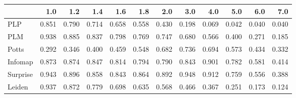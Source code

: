 \begin{tabular}{lrrrrrrrrrrr}
\toprule
{} &   1.0 &   1.2 &   1.4 &   1.6 &   1.8 &   2.0 &   3.0 &   4.0 &   5.0 &   6.0 &   7.0 \\
\midrule
PLP      & 0.851 & 0.790 & 0.714 & 0.658 & 0.558 & 0.430 & 0.198 & 0.069 & 0.042 & 0.040 & 0.040 \\
PLM      & 0.938 & 0.885 & 0.837 & 0.798 & 0.769 & 0.747 & 0.680 & 0.566 & 0.400 & 0.271 & 0.185 \\
Potts    & 0.292 & 0.346 & 0.400 & 0.459 & 0.548 & 0.682 & 0.736 & 0.694 & 0.573 & 0.434 & 0.332 \\
Infomap  & 0.873 & 0.874 & 0.847 & 0.814 & 0.794 & 0.790 & 0.843 & 0.901 & 0.782 & 0.581 & 0.414 \\
Surprise & 0.943 & 0.896 & 0.858 & 0.843 & 0.864 & 0.892 & 0.948 & 0.912 & 0.759 & 0.556 & 0.388 \\
Leiden   & 0.937 & 0.872 & 0.779 & 0.698 & 0.635 & 0.568 & 0.466 & 0.367 & 0.251 & 0.173 & 0.124 \\
\bottomrule
\end{tabular}
